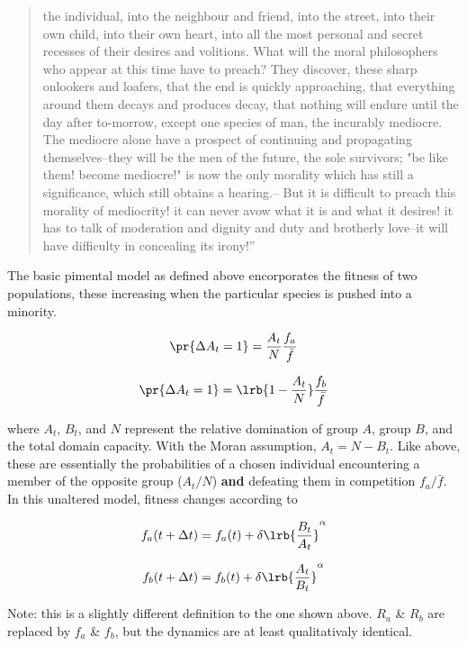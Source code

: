 \begin{quotation}
the individual, into the neighbour and friend, into the street, into their own child, into their own
heart, into all the most personal and secret recesses of their desires and volitions. What will the
moral philosophers who appear at this time have to preach? They discover, these sharp onlookers
and loafers, that the end is quickly approaching, that everything around them decays and
produces decay, that nothing will endure until the day after to-morrow, except one species of
man, the incurably mediocre. The mediocre alone have a prospect of continuing and propagating
themselves--they will be the men of the future, the sole survivors; "be like them! become
mediocre!" is now the only morality which has still a significance, which still obtains a hearing.--
But it is difficult to preach this morality of mediocrity! it can never avow what it is and what it
desires! it has to talk of moderation and dignity and duty and brotherly love--it will have
difficulty in concealing its irony!''
\end{quotation}

The basic pimental model as defined above encorporates the fitness of two populations, these increasing when the particular species is pushed into a minority. 

$$\pr{\Delta A_t = 1} = \frac{A_t}{N} \frac{f_a}{\bar f}$$

$$\pr{\Delta A_t = 1} =\lrb{ 1 - \frac{A_t}{N}} \frac{f_b}{\bar f}$$




where $A_t$, $B_t$, and $N$ represent the relative domination of group $A$, group $B$, and the total domain capacity. With the Moran assumption, $A_t = N - B_t$. Like above, these are essentially the probabilities of a chosen individual encountering a member of the opposite group ($A_t/N$) \textbf{and} defeating them in competition ${f_a}/{\bar f}$. In this unaltered model, fitness changes according to

$$f_a(t+\Delta t) = f_a(t) + \delta \lrb{\frac{B_t}{A_t}}^\alpha$$

$$f_b(t+\Delta t) = f_b(t) + \delta \lrb{\frac{A_t}{B_t}}^\alpha$$

\noindent
Note: this is a slightly different definition to the one shown above. $R_a$ \& $R_b$ are replaced by $f_a$ \& $f_b$, but the dynamics are at least qualitativaly identical. 
